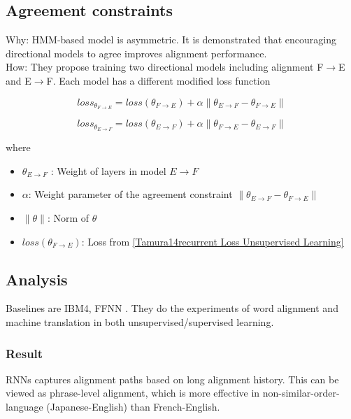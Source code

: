 \documentclass{article}
\begin{document}
\subsection{Agreement constraints}

Why: HMM-based model is asymmetric. It is demonstrated that encouraging directional models to agree improves alignment performance.
\\
How: They propose training two directional models including alignment F$\rightarrow$E and E$\rightarrow$F. Each model has a different modified loss function 

\begin{equation}
loss_{\theta_{F \rightarrow E}} = loss(\theta_{F \rightarrow E})  + \alpha \parallel \theta_{E \rightarrow F} - \theta_{F \rightarrow E} \parallel
\end{equation}

\begin{equation}
loss_{\theta_{E \rightarrow F}} = loss(\theta_{E \rightarrow F})  + \alpha \parallel \theta_{F \rightarrow E} - \theta_{E \rightarrow F} \parallel
\end{equation}

where
\begin{itemize}
\item $\theta_{E \rightarrow F}$ : Weight of layers in model $E \rightarrow F$
\item $\alpha$: Weight parameter of the agreement constraint $\parallel \theta_{E \rightarrow F} - \theta_{F \rightarrow E} \parallel$
\item $\parallel \theta \parallel$: Norm of $\theta$
\item $loss(\theta_{F \rightarrow E})$: Loss from \eqref{Tamura14recurrent Loss Unsupervised Learning}
\end{itemize}


\subsection{Analysis} 
Baselines are IBM4, FFNN \citep{Yang13word}. They do the experiments of word alignment and machine translation in both unsupervised/supervised learning.

\subsubsection{Result}
RNNs captures alignment paths based on long alignment history. This can be viewed as phrase-level alignment, which is more effective in non-similar-order-language (Japanese-English) than French-English.\\
\end{document}
